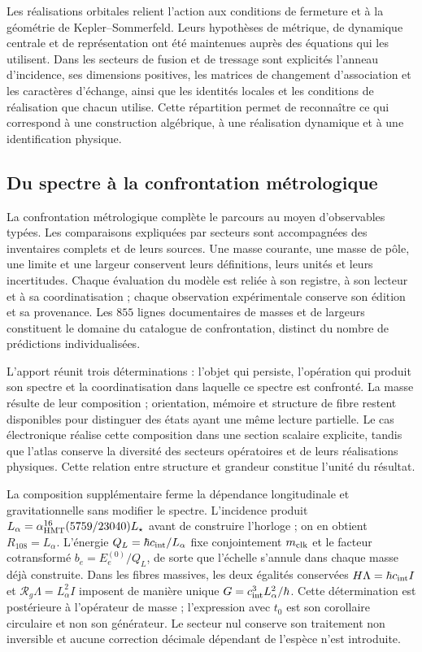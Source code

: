 Les réalisations orbitales relient l’action aux conditions de
fermeture et à la géométrie de Kepler--Sommerfeld. Leurs hypothèses de métrique,
de dynamique centrale et de représentation ont été maintenues auprès des
équations qui les utilisent. Dans les secteurs de fusion et de tressage sont
explicités l’anneau d’incidence, ses dimensions positives, les
matrices de changement d’association et les caractères d’échange,
ainsi que les identités locales et les conditions de réalisation
que chacun utilise. Cette répartition permet de reconnaître ce qui correspond à
une construction algébrique, à une réalisation dynamique et à une
identification physique.

\subsection{Du spectre à la confrontation métrologique}

La confrontation métrologique complète le parcours au moyen d’observables
typées. Les comparaisons expliquées par secteurs sont accompagnées des
inventaires complets et de leurs sources. Une masse courante, une masse
de pôle, une limite et une largeur conservent leurs définitions, leurs unités
et leurs incertitudes. Chaque évaluation du modèle est reliée à son registre,
à son lecteur et à sa coordinatisation ; chaque observation expérimentale conserve son édition
et sa provenance. Les \(855\) lignes documentaires de masses et de largeurs
constituent le domaine du catalogue de confrontation, distinct du nombre
de prédictions individualisées.

L’apport réunit trois déterminations : l’objet qui persiste,
l’opération qui produit son spectre et la coordinatisation dans laquelle ce spectre est
confronté. La masse résulte de leur composition ; orientation, mémoire et
structure de fibre restent disponibles pour distinguer des états ayant une
même lecture partielle. Le cas électronique réalise cette composition dans
une section scalaire explicite, tandis que l’atlas conserve la diversité
des secteurs opératoires et de leurs réalisations physiques. Cette relation
entre structure et grandeur constitue l’unité du résultat.

\par
La composition supplémentaire ferme la dépendance longitudinale et
gravitationnelle sans modifier le spectre. L’incidence produit
\(L_\alpha=\alpha_{\rm HMT}^{16}(5759/23040)L_\star\) avant de
construire l’horloge ; on en obtient \(R_{108}=L_\alpha\). L’énergie
\(Q_L=\hbar c_{\rm int}/L_\alpha\) fixe conjointement
\(m_{\rm clk}\) et le facteur cotransformé
\(b_e=E_e^{(0)}/Q_L\), de sorte que l’échelle s’annule dans chaque masse déjà
construite. Dans les fibres massives, les deux égalités conservées
\(H\Lambda=\hbar c_{\rm int}I\) et
\(\mathcal R_g\Lambda=L_\alpha^2I\) imposent de manière unique
\(G=c_{\rm int}^3L_\alpha^2/\hbar\). Cette détermination est postérieure à
l’opérateur de masse ; l’expression avec \(t_0\) est son corollaire circulaire et non
son générateur. Le secteur nul conserve son traitement non inversible et
aucune correction décimale dépendant de l’espèce n’est introduite.
